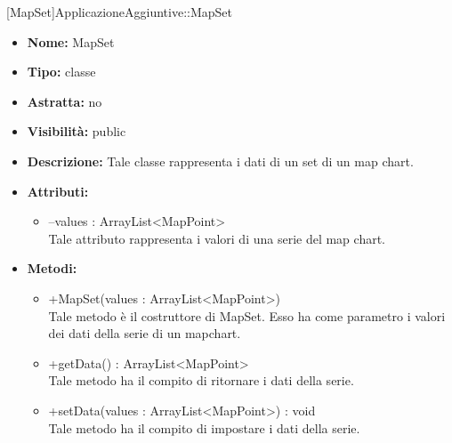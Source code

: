 			[MapSet]{ApplicazioneAggiuntive::MapSet}
			

	
			
			\begin{itemize}
			\item \textbf{Nome:} MapSet
			\item \textbf{Tipo:} classe
			
		\item \textbf{Astratta:}
		no
			\item \textbf{Visibilità:} public
			\item \textbf{Descrizione:} Tale classe rappresenta i dati di un set di un map chart.
			\item \textbf{Attributi:}
				\begin{itemize}
				\setlength{\itemsep}{5pt}
				
					\item[\ding{111}] {--values : ArrayList<MapPoint>} \\ [1mm] Tale attributo rappresenta i valori di una serie del map chart.
				\end{itemize}
		
			\item \textbf{Metodi:}
				\begin{itemize}
				\setlength{\itemsep}{5pt}
				
					\item[\ding{111}] {{+MapSet(values : ArrayList<MapPoint>)}} \\ [1mm] Tale metodo è il costruttore di MapSet. Esso ha come parametro i valori dei dati della serie di un mapchart.
					\item[\ding{111}] {{+getData() : ArrayList<MapPoint>}} \\ [1mm] Tale metodo ha il compito di ritornare i dati della serie.
					\item[\ding{111}] {{+setData(values : ArrayList<MapPoint>) : void}} \\ [1mm] Tale metodo ha il compito di impostare i dati della serie.
				\end{itemize}
		
			\end{itemize}
	
